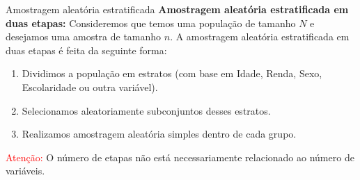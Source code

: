 \begin{frame}{Amostragem aleatória estratificada}
\textbf{Amostragem aleatória estratificada em duas etapas:} Consideremos que temos uma população de tamanho $N$ e desejamos uma amostra de tamanho $n$.
A amostragem aleatória estratificada em duas etapas é feita da seguinte forma:
\begin{enumerate}
    \item Dividimos a população em estratos (com base em Idade, Renda, Sexo, Escolaridade ou outra variável).
    \pause
    \item Selecionamos aleatoriamente subconjuntos desses estratos.  
    \pause
    \item Realizamos amostragem aleatória simples dentro de cada grupo.
\end{enumerate}
\pause
\textcolor{red}{Atenção:} O número de etapas não está necessariamente relacionado ao número de variáveis.
\end{frame}



